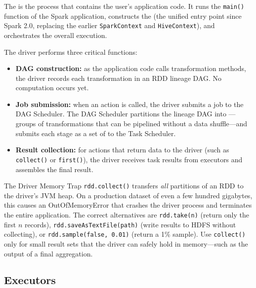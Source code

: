 The  is the process that contains the user's
application code. It runs the \texttt{main()} function of the Spark
application, constructs the  (the unified entry point
since Spark 2.0, replacing the earlier \texttt{SparkContext} and
\texttt{HiveContext}), and orchestrates the overall execution.

The driver performs three critical functions:
\begin{itemize}
  \item \textbf{DAG construction:} as the application code calls
        transformation methods, the driver records each transformation
        in an RDD lineage DAG. No computation occurs yet.
  \item \textbf{Job submission:} when an action is called, the driver
        submits a job to the DAG Scheduler. The DAG Scheduler partitions
        the lineage DAG into ---groups of transformations
        that can be pipelined without a data shuffle---and submits each
        stage as a set of  to the Task Scheduler.
  \item \textbf{Result collection:} for actions that return data to the
        driver (such as \texttt{collect()} or \texttt{first()}), the
        driver receives task results from executors and assembles the
        final result.
\end{itemize}

\begin{caution}{The Driver Memory Trap}
\texttt{rdd.collect()} transfers \emph{all} partitions of an RDD to the
driver's JVM heap. On a production dataset of even a few hundred
gigabytes, this causes an OutOfMemoryError that crashes the driver
process and terminates the entire application. The correct alternatives
are \texttt{rdd.take(n)} (return only the first $n$ records),
\texttt{rdd.saveAsTextFile(path)} (write results to HDFS without
collecting), or \texttt{rdd.sample(false, 0.01)} (return a 1\% sample).
Use \texttt{collect()} only for small result sets that the driver
can safely hold in memory---such as the output of a final aggregation.
\end{caution}

\subsection{Executors}
\label{subsec:executors}


